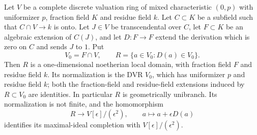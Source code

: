 \begin{lemma}
\label{lem:C-RD11-ring}
Let $V$ be a complete discrete valuation ring of mixed characteristic
$(0,p)$ with uniformizer $p$, fraction field $K$ and residue field $k$.
Let $C\subset K$ be a subfield such that $C\cap V\to k$ is onto.
Let $J\in V$ be transcendental over $C$, let $F\subset K$ be an
algebraic extension of $C(J)$, and let $D:F\to F$ extend the derivation
which is zero on $C$ and sends $J$ to $1$. Put
\[
 V_0=F\cap V,\qquad R=\{a\in V_0:D(a)\in V_0\}.
\]
Then $R$ is a one-dimensional noetherian local domain, with fraction
field $F$ and residue field $k$. Its normalization is the DVR $V_0$,
which has uniformizer $p$ and residue field $k$; both the fraction-field
and residue-field extensions induced by $R\subset V_0$ are identities.
In particular $R$ is geometrically unibranch. Its normalization is not
finite, and the homomorphism
\[
 R\longrightarrow V[\epsilon]/(\epsilon^2),
 \qquad a\longmapsto a+\epsilon D(a)
                                                        \tag{C-RD11.1}
\]
identifies its maximal-ideal completion with
$V[\epsilon]/(\epsilon^2)$.
\end{lemma}
